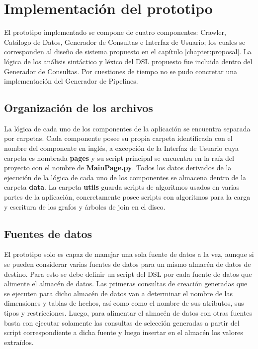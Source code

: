 \section{Implementación del prototipo}\label{section:prototype}

El prototipo implementado se compone de cuatro componentes: Crawler, Cat\'alogo de Datos, Generador de Consultas 
e Interfaz de Usuario; los cuales se corresponden al diseño de sistema propuesto en el cap\'itulo \ref{chapter:proposal}. 
La l\'ogica de los an\'alisis sintáctico y l\'exico del DSL propuesto fue incluida dentro del Generador de Consultas. 
Por cuestiones de tiempo no se pudo concretar una implementaci\'on del Generador de Pipelines.

\subsection{Organización de los archivos}

La l\'ogica de cada uno de los componentes de la aplicaci\'on se encuentra separada por carpetas. Cada componente 
posee su propia carpeta identificada con el nombre del componente en ingl\'es, a excepción de la Interfaz de Usuario 
cuya carpeta es nombrada \textbf{pages} y su script principal se encuentra en la ra\'iz del proyecto con el nombre de 
\textbf{MainPage.py}. Todos los datos derivados de la ejecución de la l\'ogica de cada uno de los componentes 
se almacena dentro de la carpeta \textbf{data}. La carpeta \textbf{utils} guarda scripts de algoritmos usados 
en varias partes de la aplicaci\'on, concretamente posee scripts con algoritmos para la carga y escritura de los 
grafos y \'arboles de join en el disco.

\subsection{Fuentes de datos}

El prototipo solo es capaz de manejar una sola fuente de datos a la vez, aunque si se pueden considerar varias 
fuentes de datos para un mismo almac\'en de datos de destino. Para esto se debe definir un script del DSL por 
cada fuente de datos que alimente el almac\'en de datos. Las primeras consultas de creación generadas que se ejecuten 
para dicho almac\'en de datos van a determinar el nombre de las dimensiones y tablas de hechos, as\'i como 
como el nombre de sus atributos, sus tipos y restricciones. Luego, para alimentar el almac\'en de datos con otras 
fuentes basta con ejecutar solamente las consultas de selecci\'on generadas a partir del script correspondiente a 
dicha fuente y luego insertar en el almac\'en los valores extra\'idos.


